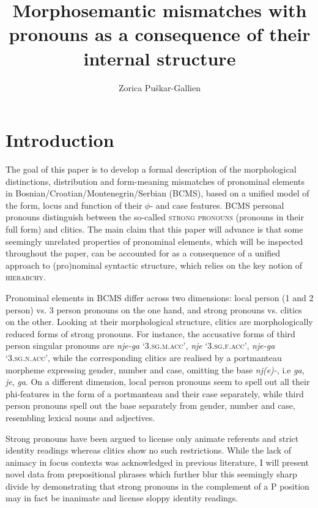 \documentclass[output=paper,colorlinks,citecolor=brown]{langscibook}
\author{Zorica Puškar-Gallien\orcid{0000-0003-4130-0598}\affiliation{Leibniz-Centre General Linguistics}}
\title[Morphosemantic mismatches with pronouns]{Morphosemantic mismatches with pronouns as a consequence of their internal structure}
\begin{document}
\maketitle

%

\section{Introduction}\label{pus:sec:introduction}

The goal of this paper is to develop a formal description of the morphological distinctions, distribution and form-meaning mismatches of pronominal elements in Bosnian/Croatian/Montenegrin/Serbian (BCMS), based on a unified model of the form, locus and function of their $\phi$- and case features. BCMS personal pronouns distinguish between the so-called \textsc{strong pronouns} (pronouns in their full form) and clitics. The main claim that this paper will advance is that some seemingly unrelated properties of pronominal elements, which will be inspected throughout the paper, can be accounted for as a consequence of a unified approach to (pro)nominal syntactic structure, which relies on the key notion of \textsc{hierarchy}.

Pronominal elements in BCMS differ across two dimensions: local person (1\fst{} and 2\nd{} person) vs. 3\rd{} person  pronouns on the one hand, and strong pronouns vs. clitics on the other. Looking at their morphological structure, clitics are morphologically reduced forms of strong pronouns. For instance, the accusative forms of third person singular pronouns are \textit{nje-ga} `\textsc{3.sg.m.acc}', \textit{nje} `\textsc{3.sg.f.acc}', \textit{nje-ga} `\textsc{3.sg.n.acc}', while the corresponding clitics are realised by a portmanteau morpheme expressing gender, number and case, omitting the base \textit{nj(e)-}, i.e  \textit{ga}, \textit{je}, \textit{ga}. On a different dimension, local person pronouns seem to spell out all their phi-features in the form of a portmanteau and their case separately, while third person pronouns spell out the base separately from gender, number and case, resembling lexical nouns and adjectives. 

Strong pronouns have been argued to license only animate referents and strict identity readings whereas clitics show no such restrictions. While the lack of animacy in focus contexts was acknowledged in previous literature, I will present novel data from prepositional phrases which further blur this seemingly sharp divide by demonstrating that strong pronouns in the complement of a P position may in fact be inanimate and license sloppy identity readings. %
\end{document}
